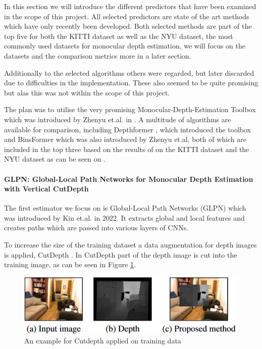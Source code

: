 In this section we will introduce the different predictors that have been examined in the scope of this project. All selected predictors are state of the art methods which have only recently been developed. Both selected methods are part of the top five for both the KITTI dataset as well as the NYU dataset, the most commonly used datasets for monocular depth estimation, we will focus on the datasets and the comparison metrics more in a later section.

Additionally to the selected algorithms others were regarded, but later discarded due to difficulties in the implementation. These also seemed to be quite promising but alas this was not within the scope of this project.

The plan was to utilise the very promising Monocular-Depth-Estimation Toolbox which was introduced by Zhenyu et.al. in \cite{toolbox}. A multitude of algorithms are available for comparison, including Depthformer \cite{mono_depthestimation_depthformer}, which introduced the toolbox and BinsFormer \cite{mono_depthestimation_binsformer} which was also introduced by Zhenyu et.al, both of which are included in the top three based on the results of on the KITTI dataset and the NYU dataset as can be seen on \cite{paperswithcode}.

\paragraph{GLPN: Global-Local Path Networks for Monocular Depth Estimation with Vertical CutDepth}

The first estimator we focus on is Global-Local Path Networks (GLPN) \cite{mono_depthestimation_glpn} which was introduced by Kin et.al. in 2022. It extracts global and local features and creates paths which are passed into various layers of CNNs.

To increase the size of the training dataset a data augmentation for depth images is applied, CutDepth \cite{cutdepth}. In CutDepth part of the depth image is cut into the training image, as can be seen in Figure \ref{fig:cutdepth}.

\begin{figure}
    \centering
    \includegraphics[width=.8\linewidth]{figures/Monocular_depth/cutdepth.png}
    \caption{An example for Cutdepth applied on training data}
    \label{fig:cutdepth}
\end{figure}

